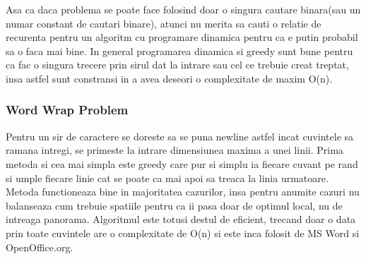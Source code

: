 \documentclass[runningheads]{llncs}
\begin{document}
Asa ca daca
problema se poate face folosind doar o singura cautare binara(sau un numar constant de cautari binare), atunci
nu merita sa cauti o relatie de recurenta
pentru un algoritm cu programare dinamica pentru ca e putin probabil sa o faca mai bine. In general programarea dinamica si
greedy sunt bune pentru ca fac o singura trecere prin sirul dat la intrare sau cel ce trebuie creat treptat, insa astfel
sunt constransi in a avea deseori o complexitate de maxim O(n).

\subsubsection{Word Wrap Problem}
Pentru un sir de caractere se doreste sa se puna newline astfel incat cuvintele sa ramana intregi, se primeste la
intrare dimensiunea maxima a unei linii. Prima metoda si cea mai simpla este greedy care pur si simplu ia fiecare
cuvant pe rand si umple fiecare linie cat se poate ca mai apoi sa treaca la linia urmatoare. Metoda functioneaza
bine in majoritatea cazurilor, insa pentru anumite cazuri nu balanseaza cum trebuie spatiile pentru ca ii pasa
doar de optimul local, nu de intreaga panorama. Algoritmul este totusi destul de eficient, trecand doar o data
prin toate cuvintele are o complexitate de O(n) si este inca folosit de MS Word si OpenOffice.org.
\end{document}
